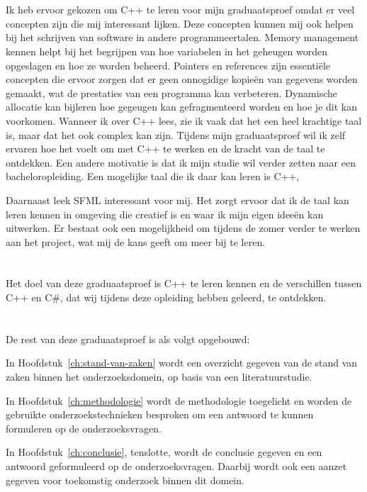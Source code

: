 \section{}%
\label{sec:Toelichting van mijn keuze}

Ik heb ervoor gekozen om C++ te leren voor mijn graduaatsproef omdat er veel concepten zijn die mij interessant lijken. 
Deze concepten kunnen mij ook helpen bij het schrijven van software in andere programmeertalen. Memory management kennen helpt bij het begrijpen 
van hoe variabelen in het geheugen worden opgeslagen en hoe ze worden beheerd. Pointers en references zijn essentiële concepten 
die ervoor zorgen dat er geen onnogidige kopieën van gegevens worden gemaakt, wat de prestaties van een programma kan verbeteren. 
Dynamische allocatie kan bijleren hoe gegeugen kan gefragmenteerd worden en hoe je dit kan voorkomen. 
Wanneer ik over C++ lees, zie ik vaak dat het een heel krachtige taal is, maar dat het ook complex kan zijn. 
Tijdens mijn graduaatsproef wil ik zelf ervaren hoe het voelt om met C++ te werken en de kracht van de taal te ontdekken. 
Een andere motivatie is dat ik mijn studie wil verder zetten naar een bacheloropleiding. Een mogelijke taal die ik daar kan leren is C++, 

Daarnaast leek SFML interessant voor mij. Het zorgt ervoor dat ik de taal kan leren kennen in
omgeving die creatief is en waar ik mijn eigen ideeën kan uitwerken. 
Er bestaat ook een mogelijkheid om tijdens de zomer verder te werken aan het project, wat mij de kans geeft om meer bij te leren.

\section{}%
\label{sec:onderzoeksdoelstelling}
Het doel van deze graduaatsproef is C++ te leren kennen en de verschillen tussen 
C++ en C\#, dat wij tijdens deze opleiding hebben geleerd, te ontdekken. 

\section{}%
\label{sec:opzet-graduaatsproef}

De rest van deze graduaatsproef is als volgt opgebouwd:

In Hoofdstuk~\ref{ch:stand-van-zaken} wordt een overzicht gegeven van de stand van zaken binnen het onderzoeksdomein, op basis van een literatuurstudie.

In Hoofdstuk~\ref{ch:methodologie} wordt de methodologie toegelicht en worden de gebruikte onderzoekstechnieken besproken om een antwoord te kunnen formuleren op de onderzoeksvragen.


In Hoofdstuk~\ref{ch:conclusie}, tenslotte, wordt de conclusie gegeven en een antwoord geformuleerd op de onderzoeksvragen. Daarbij wordt ook een aanzet gegeven voor toekomstig onderzoek binnen dit domein.